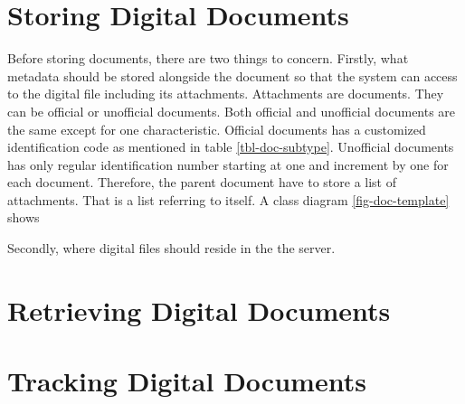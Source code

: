 \section{Storing Digital Documents}
Before storing documents, there are two things to concern.
Firstly, what metadata should be stored alongside the document so that the system can access to the digital file including its attachments.
Attachments are documents.
They can be official or unofficial documents.
Both official and unofficial documents are the same except for one characteristic.
Official documents has a customized identification code as mentioned in table \ref{tbl-doc-subtype}.
Unofficial documents has only regular identification number starting at one and increment by one for each document.
Therefore, the parent document have to store a list of attachments.
That is a list referring to itself.
A class diagram \ref{fig-doc-template} shows 

Secondly, where digital files should reside in the the server.


\section{Retrieving Digital Documents}

\section{Tracking Digital Documents}